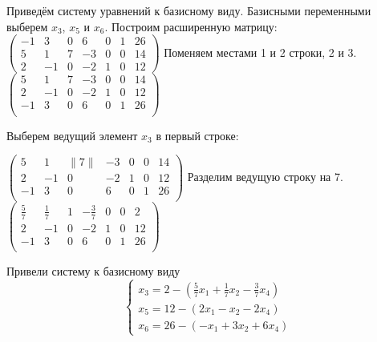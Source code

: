 \documentclass[a4paper,14pt]{extarticle}
\begin{document}
Приведём систему уравнений к базисному виду. Базисными переменными выберем $x_3$, $x_5$ и $x_6$.
Построим расширенную матрицу:\bigbreak
$\begin{pmatrix}
        -1 & 3  & 0 & 6  & 0 & 1 & 26 \\
        5  & 1  & 7 & -3 & 0 & 0 & 14 \\
        2  & -1 & 0 & -2 & 1 & 0 & 12
    \end{pmatrix}$\bigbreak
Поменяем местами 1 и 2 строки, 2 и 3.\bigbreak
$\begin{pmatrix}
        5  & 1  & 7 & -3 & 0 & 0 & 14 \\
        2  & -1 & 0 & -2 & 1 & 0 & 12 \\
        -1 & 3  & 0 & 6  & 0 & 1 & 26 \\
    \end{pmatrix}$\bigbreak

Выберем ведущий элемент $x_3$ в первый строке:\bigbreak

$\begin{pmatrix}
        5  & 1  & \|7\| & -3 & 0 & 0 & 14 \\
        2  & -1 & 0     & -2 & 1 & 0 & 12 \\
        -1 & 3  & 0     & 6  & 0 & 1 & 26 \\
    \end{pmatrix}$\bigbreak
Разделим ведущую строку на 7.\bigbreak
$\begin{pmatrix}
        \frac{5}{7} & \frac{1}{7} & 1 & -\frac{3}{7} & 0 & 0 & 2  \\
        2           & -1          & 0 & -2           & 1 & 0 & 12 \\
        -1          & 3           & 0 & 6            & 0 & 1 & 26 \\
    \end{pmatrix}$\bigbreak

Привели систему к базисному виду
\begin{equation*}
    \begin{cases}
        x_3 = 2 - (\frac{5}{7}x_1 + \frac{1}{7}x_2 -\frac{3}{7}x_4) \\
        x_5 = 12 - (2x_1 - x_2 - 2x_4)                              \\
        x_6 = 26 - (-x_1 + 3x_2 + 6x_4)
    \end{cases}
\end{equation*}\bigbreak
\end{document}
